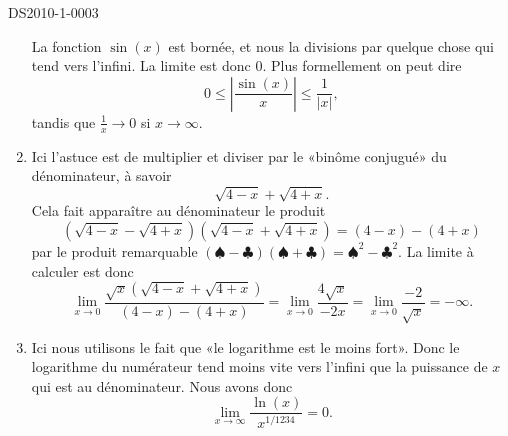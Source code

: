 \begin{corrige}{DS2010-1-0003}
\begin{enumerate}
			La fonction $\sin(x)$ est bornée, et nous la divisions par quelque chose qui tend vers l'infini. La limite est donc $0$. Plus formellement on peut dire
			\begin{equation}
				0\leq\left| \frac{ \sin(x) }{ x } \right| \leq \frac{ 1 }{ | x | },
			\end{equation}
			tandis que $\frac{ 1 }{ x }\to 0$ si $x\to\infty$.
		\item
			Ici l'astuce est de multiplier et diviser par le «binôme conjugué» du dénominateur, à savoir
			\begin{equation}
				\sqrt{4-x}+\sqrt{4+x}.
			\end{equation}
			Cela fait apparaître au dénominateur le produit
			\begin{equation}
				(\sqrt{4-x}-\sqrt{4+x})(\sqrt{4-x}+\sqrt{4+x})=(4-x)-(4+x)
			\end{equation}
			par le produit remarquable $(\spadesuit-\clubsuit)(\spadesuit+\clubsuit)=\spadesuit^2-\clubsuit^2$. La limite à calculer est donc
			\begin{equation}
				\lim_{x\to 0} \frac{ \sqrt{x}\left( \sqrt{4-x}+\sqrt{4+x} \right) }{ (4-x)-(4+x) }=\lim_{x\to 0} \frac{ 4\sqrt{x} }{ -2x }=\lim_{x\to 0} \frac{ -2 }{ \sqrt{x} }=-\infty.
			\end{equation}

		\item
			Ici nous utilisons le fait que «le logarithme est le moins fort». Donc le logarithme du numérateur tend moins vite vers l'infini que la puissance de $x$ qui est au dénominateur. Nous avons donc
			\begin{equation}
				\lim_{x\to \infty} \frac{ \ln(x) }{ x^{1/1234} }=0.
			\end{equation}
	\end{enumerate}

\end{corrige}
